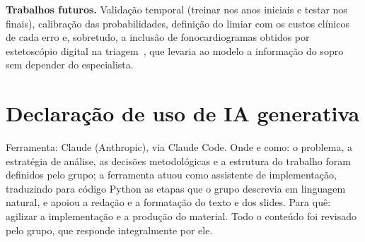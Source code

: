 \documentclass[conference,a4paper]{IEEEtran}
\begin{document}
\textbf{Trabalhos futuros.} Validação temporal (treinar nos anos iniciais e testar nos finais), calibração das probabilidades, definição do limiar com os custos clínicos de cada erro e, sobretudo, a inclusão de fonocardiogramas obtidos por estetoscópio digital na triagem~\cite{oliveira2022}, que levaria ao modelo a informação do sopro sem depender do especialista.

\section*{Declaração de uso de IA generativa}

Ferramenta: Claude (Anthropic), via Claude Code. Onde e como: o problema, a estratégia de análise, as decisões metodológicas e a estrutura do trabalho foram definidos pelo grupo; a ferramenta atuou como assistente de implementação, traduzindo para código Python as etapas que o grupo descrevia em linguagem natural, e apoiou a redação e a formatação do texto e dos slides. Para quê: agilizar a implementação e a produção do material. Todo o conteúdo foi revisado pelo grupo, que responde integralmente por ele.



\end{document}
